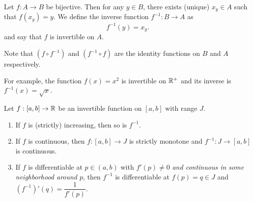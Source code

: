 \begin{defn} \label{defn:diff:inverse}
    Let $f : A \to B$ be bijective. Then for any $y \in B$, there exists (unique) $x_{y} \in A$ such that $f(x_{y}) = y$. We define the inverse function $f^{-1} : B \to A$ as \[
        f^{-1}(y) = x_{y}.
    \] and say that $f$ is invertible on $A$.

    Note that $(f \circ f^{-1})$ and $(f^{-1} \circ f)$ are the identity functions on $B$ and $A$ respectively.
    
    For example, the function $f(x) = x^{2}$ is invertible on $\mathbb{R}^{+}$ and its inverse is $f^{-1}(x) = \sqrt{x}$.
\end{defn}

\begin{thm} \label{thm:diff:inverse}
    Let $f : [a, b] \to \mathbb{R}$ be an invertible function on $[a, b]$ with range $J$.
    \begin{enumerate}[label=(\roman*)]
        \item If $f$ is (strictly) increasing, then so is $f^{-1}$.
        \item If $f$ is continuous, then $f : [a, b] \to J$ is strictly monotone and $f^{-1} : J \to [a, b]$ is continuous.
        \item If $f$ is differentiable at $p \in (a, b)$ with $f'(p) \neq 0$ \emph{and continuous in some neighborhood around $p$}, then $f^{-1}$ is differentiable at $f(p) = q \in J$ and $(f^{-1})'(q) = \dfrac{1}{f'(p)}$.
    \end{enumerate}
\end{thm}
